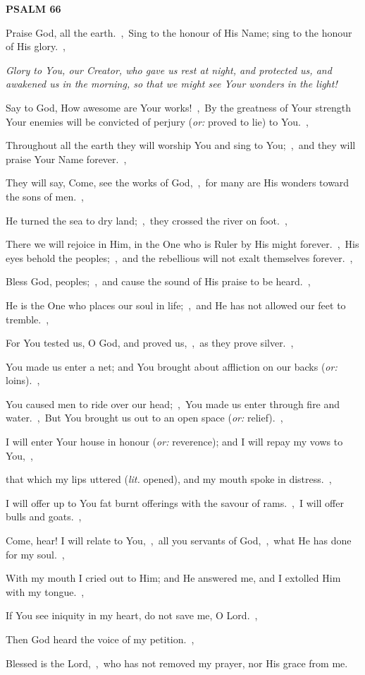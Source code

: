 \documentclass[12pt,twoside,a5paper]{article}
\newcommand{\psalm}[1]{\textbf{PSALM {#1}}\nopagebreak}
\newcommand{\qanona}[1]{{\liturgicalhint{Qanona.} \emph{#1}}}
\newcommand{\translationoption}[1]{\emph{or:} #1}
\newcommand{\translationliteral}[1]{\emph{lit.} #1}
\begin{document}
\psalm{66}

\begin{normalparskip}
  Praise God, all the earth.~\sep\ Sing to the honour of His Name; sing to the honour of His glory.~\sep

  \qanona{Glory to You, our Creator, who gave us rest at night, and protected us, and awakened us in the morning, so that we might see Your wonders in the light!}

  Say to God, How awesome are Your works!~\sep\ By the greatness of Your strength Your enemies will be convicted of perjury (\translationoption{proved to lie}) to You.~\sep

  Throughout all the earth they will worship You and sing to You;~\sep\ and they will praise Your Name forever.~\sep

  They will say, Come, see the works of God,~\sep\ for many are His wonders toward the sons of men.~\sep

  He turned the sea to dry land;~\sep\ they crossed the river on foot.~\sep

  There we will rejoice in Him, in the One who is Ruler by His might forever.~\sep\ His eyes behold the peoples;~\sep\ and the rebellious will not exalt themselves forever.~\sep

  Bless God, peoples;~\sep\ and cause the sound of His praise to be heard.~\sep

  He is the One who places our soul in life;~\sep\ and He has not allowed our feet to tremble.~\sep

  For You tested us, O God, and proved us,~\sep\ as they prove silver.~\sep

  You made us enter a net; and You brought about affliction on our backs (\translationoption{loins}).~\sep

  You caused men to ride over our head;~\sep\ You made us enter through fire and water.~\sep\ But You brought us out to an open space (\translationoption{relief}).~\sep

  I will enter Your house in honour (\translationoption{reverence}); and I will repay my vows to You,~\sep

  that which my lips uttered (\translationliteral{opened}), and my mouth spoke in distress.~\sep

  I will offer up to You fat burnt offerings with the savour of rams.~\sep\ I will offer bulls and goats.~\sep

  Come, hear! I will relate to You,~\sep\ all you servants of God,~\sep\ what He has done for my soul.~\sep

  With my mouth I cried out to Him; and He answered me, and I extolled Him with my tongue.~\sep

  If You see iniquity in my heart, do not save me, O Lord.~\sep

  Then God heard the voice of my petition.~\sep

  Blessed is the Lord,~\sep\ who has not removed my prayer, nor His grace from me.
\end{normalparskip}
\end{document}
